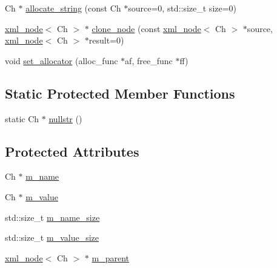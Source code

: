 \begin{DoxyCompactItemize}
\item 
Ch $\ast$ \hyperlink{classrapidxml_1_1memory__pool_a171941b39d55b868358da97462185f58}{allocate\+\_\+string} (const Ch $\ast$source=0, std\+::size\+\_\+t size=0)
\item 
\hyperlink{classrapidxml_1_1xml__node}{xml\+\_\+node}$<$ Ch $>$ $\ast$ \hyperlink{classrapidxml_1_1memory__pool_a0a10679fc17597d339a0dc107f8a94ac}{clone\+\_\+node} (const \hyperlink{classrapidxml_1_1xml__node}{xml\+\_\+node}$<$ Ch $>$ $\ast$source, \hyperlink{classrapidxml_1_1xml__node}{xml\+\_\+node}$<$ Ch $>$ $\ast$result=0)
\item 
void \hyperlink{classrapidxml_1_1memory__pool_a84d3d8d2cdfc00501e1dcf26d889ae03}{set\+\_\+allocator} (alloc\+\_\+func $\ast$af, free\+\_\+func $\ast$ff)
\end{DoxyCompactItemize}
\subsection*{Static Protected Member Functions}
\begin{DoxyCompactItemize}
\item 
static Ch $\ast$ \hyperlink{classrapidxml_1_1xml__base_ad96ff6b1e41dab3ff60b9bc4df769a75}{nullstr} ()
\end{DoxyCompactItemize}
\subsection*{Protected Attributes}
\begin{DoxyCompactItemize}
\item 
Ch $\ast$ \hyperlink{classrapidxml_1_1xml__base_afd9851ed43e14619db0d7075ef8e9e8a}{m\+\_\+name}
\item 
Ch $\ast$ \hyperlink{classrapidxml_1_1xml__base_a278a1ea63b0b70219b946cec47fa00ea}{m\+\_\+value}
\item 
std\+::size\+\_\+t \hyperlink{classrapidxml_1_1xml__base_a5a8c76a7274b4180213796422c4df76f}{m\+\_\+name\+\_\+size}
\item 
std\+::size\+\_\+t \hyperlink{classrapidxml_1_1xml__base_aa3a49d8ceddb8a8d7edb773a2226b89c}{m\+\_\+value\+\_\+size}
\item 
\hyperlink{classrapidxml_1_1xml__node}{xml\+\_\+node}$<$ Ch $>$ $\ast$ \hyperlink{classrapidxml_1_1xml__base_a90d5f660f078f66563fd7b2d8387ccb0}{m\+\_\+parent}
\end{DoxyCompactItemize}
